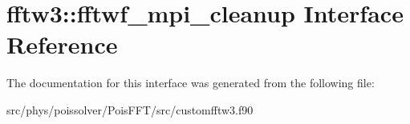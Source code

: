 \hypertarget{interfacefftw3_1_1fftwf__mpi__cleanup}{}\section{fftw3\+:\+:fftwf\+\_\+mpi\+\_\+cleanup Interface Reference}
\label{interfacefftw3_1_1fftwf__mpi__cleanup}


The documentation for this interface was generated from the following file\+:\begin{DoxyCompactItemize}
\item 
src/phys/poissolver/\+Pois\+F\+F\+T/src/customfftw3.\+f90\end{DoxyCompactItemize}

